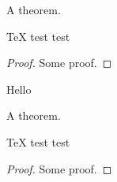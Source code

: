 \documentclass[a4paper, 11pt]{book}
\begin{document}
\begin{theorem}
    A theorem.
\end{theorem}
\begin{code}[autowidth = lower, listing and text]{\TeX}
    test \hspace{5cm} test
\end{code}
\begin{proof}
    Some proof.
\end{proof}
Hello
\begin{theorem}
    A theorem.
\end{theorem}
\begin{code}{\TeX}
    test \hspace{5cm} test
\end{code}
\begin{proof}
    Some proof.
\end{proof}
\end{document}
